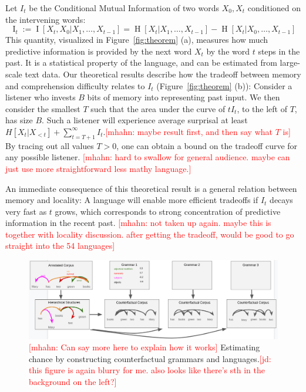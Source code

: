\documentclass[12pt]{article}
\newcounter{theorem}
\newcommand{\jd}[1]{\textcolor{Red}{[jd: #1]}}
\newcommand{\mhahn}[1]{\textcolor{Red}{[mhahn: #1]}}
\begin{document}
Let $I_t$ be the Conditional Mutual Information of two words $X_0, X_t$ conditioned on the intervening words:
\begin{equation}
	\operatorname{I}_t := \operatorname{I}[X_t, X_0 | X_1, \dots, X_{t-1}] = \operatorname{H}[X_t|X_1, \dots, X_{t-1}] - \operatorname{H}[X_t|X_0, \dots, X_{t-1}] 
\end{equation}
This quantity, visualized in Figure~\ref{fig:theorem} (a), measures how much predictive information is provided by the next word $X_t$ by the word $t$ steps in the past.
It is a statistical property of the language, and can be estimated from large-scale text data.
Our theoretical results describe how the tradeoff between memory and comprehension difficulty relates to $I_t$ (Figure~\ref{fig:theorem} (b)):
Consider a listener who invests $B$ bits of memory into representing past input.
We then consider the smallest $T$ such that the area under the curve of $t I_t$, to the left of $T$, has size $B$.
Such a listener will experience average surprisal at least $H[X_t| X_{<t}] + \sum_{t=T+1}^\infty I_t$.\mhahn{maybe result first, and then say what $T$ is}
By tracing out all values $T >0$, one can obtain a bound on the tradeoff curve for any possible listener.
\mhahn{hard to swallow for general audience. maybe can just use more straightforward less mathy language.}

An immediate consequence of this theoretical result is a general relation between memory and locality:
A language will enable more efficient tradeoffs if $I_t$ decays very fast as $t$ grows, which corresponds to strong concentration of predictive information in the recent past.
\mhahn{not taken up again. maybe this is together with locality discussion. after getting the tradeoff, would be good to go straight into the 54 languages}







\begin{figure}
\centering
\includegraphics[width=\textwidth]{figures-gdrive/counterfactual-languages.png}
	\caption{\mhahn{Can say more here to explain how it works} Estimating chance by constructing counterfactual grammars and languages.\jd{this figure is again blurry for me. also looks like there's sth in the background on the left?}}\label{fig:grammars}
\end{figure}
\end{document}
